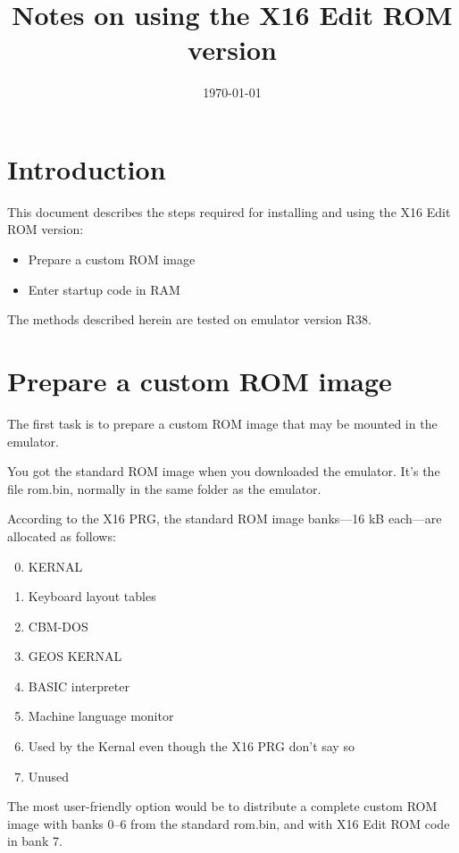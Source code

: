 \documentclass{article}
\title{Notes on using the X16 Edit ROM version}
\date{\today}
\begin{document}
\maketitle

\section{Introduction}

    This document describes the steps required for installing and using the X16 Edit ROM version:

    \begin{itemize}
        \item Prepare a custom ROM image
        \item Enter startup code in RAM
    \end{itemize}

    \noindent The methods described herein are tested on emulator version R38.

\section{Prepare a custom ROM image}

    The first task is to prepare a custom ROM image that may be mounted in the emulator.

    You got the standard ROM image when you downloaded the emulator. It's the file
    rom.bin, normally in the same folder as the emulator.

    According to the X16 PRG, the standard ROM image banks---16 kB each---are allocated as follows:

    \begin{enumerate}
        \setcounter{enumi}{-1}
        \item KERNAL
        \item Keyboard layout tables
        \item CBM-DOS
        \item GEOS KERNAL
        \item BASIC interpreter
        \item Machine language monitor
        \item Used by the Kernal even though the X16 PRG don't say so
        \item Unused
    \end{enumerate}

    \noindent The most user-friendly option would be to distribute a complete custom ROM image with
    banks 0--6 from the standard rom.bin, and with X16 Edit ROM code in bank 7.
\end{document}
